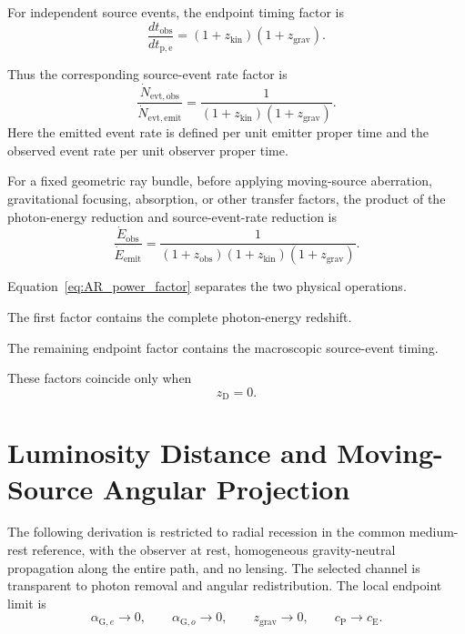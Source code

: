 For independent source events, the endpoint timing factor is
\begin{equation}
    \boxed{
    \frac{
        dt_{\mathrm{obs}}
    }{
        dt_{\mathrm{p,e}}
    }
    =
    (1+z_{\mathrm{kin}})
    (1+z_{\mathrm{grav}}).
    }
    \label{eq:AR_arrival_time}
\end{equation}

Thus the corresponding source-event rate factor is
\begin{equation}
    \boxed{
    \frac{
        \dot N_{\mathrm{evt,obs}}
    }{
        \dot N_{\mathrm{evt,emit}}
    }
    =
    \frac{1}{
        (1+z_{\mathrm{kin}})
        (1+z_{\mathrm{grav}})
    }.
    }
    \label{eq:AR_arrival_rate}
\end{equation}
Here the emitted event rate is defined per unit emitter proper time and the
observed event rate per unit observer proper time.

For a fixed geometric ray bundle, before applying moving-source aberration,
gravitational focusing, absorption, or other transfer factors, the product of
the photon-energy reduction and source-event-rate reduction is
\begin{equation}
    \boxed{
    \frac{
        \dot E_{\mathrm{obs}}
    }{
        \dot E_{\mathrm{emit}}
    }
    =
    \frac{1}{
        (1+z_{\mathrm{obs}})
        (1+z_{\mathrm{kin}})
        (1+z_{\mathrm{grav}})
    }.
    }
    \label{eq:AR_power_factor}
\end{equation}

Equation~\eqref{eq:AR_power_factor} separates the two physical operations.

The first factor contains the complete photon-energy redshift.

The remaining endpoint factor contains the macroscopic source-event timing.

These factors coincide only when
\begin{equation}
    z_{\mathrm D}=0.
\end{equation}

\section{Luminosity Distance and Moving-Source Angular Projection}

The following derivation is restricted to radial recession in the common
medium-rest reference, with the observer at rest, homogeneous gravity-neutral
propagation along the entire path, and no lensing. The selected channel is
transparent to photon removal and angular redistribution. The local endpoint
limit is
\begin{equation}
    \alpha_{\mathrm G,e}
    \rightarrow
    0,
    \qquad
    \alpha_{\mathrm G,o}
    \rightarrow
    0,
    \qquad
    z_{\mathrm{grav}}
    \rightarrow
    0,
    \qquad
    c_{\mathrm P}
    \rightarrow
    c_{\mathrm E}.
\end{equation}

